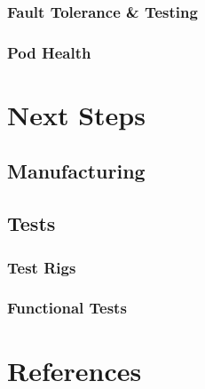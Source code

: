 \documentclass{report}
\begin{document}
    \subsection{Fault Tolerance \& Testing}
    \subsection{Pod Health}
    
    \chapter{Next Steps}
    
    \section{Manufacturing}
    \section{Tests}
    \subsection{Test Rigs}
    \subsection{Functional Tests}
    
    
    
    \chapter{References}
    
\end{document}
